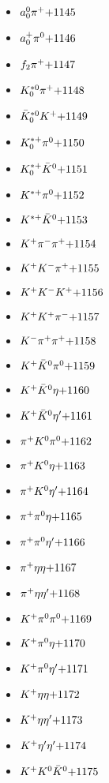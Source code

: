 \begin{multicols}{3}
\begin{itemize}
 \item $ a_{0}^{0} \pi^{+} \hfill{+1145}$
 \item $ a_{0}^{+} \pi^{0} \hfill{+1146}$
 \item $ f_{2} \pi^{+} \hfill{+1147}$
 \item $ K_{0}^{*0} \pi^{+} \hfill{+1148}$
 \item $ \bar{K}_{0}^{*0} K^{+} \hfill{+1149}$
 \item $ K_{0}^{*+} \pi^{0} \hfill{+1150}$
 \item $ K_{0}^{*+} \bar{K}^{0} \hfill{+1151}$
 \item $ K^{*+} \pi^{0} \hfill{+1152}$
 \item $ K^{*+} \bar{K}^{0} \hfill{+1153}$
 \item $ K^{+} \pi^{-} \pi^{+} \hfill{+1154}$
 \item $ K^{+} K^{-} \pi^{+} \hfill{+1155}$
 \item $ K^{+} K^{-} K^{+} \hfill{+1156}$
 \item $ K^{+} K^{+} \pi^{-} \hfill{+1157}$
 \item $ K^{-} \pi^{+} \pi^{+} \hfill{+1158}$
 \item $ K^{+} \bar{K}^{0} \pi^{0} \hfill{+1159}$
 \item $ K^{+} \bar{K}^{0} \eta \hfill{+1160}$
 \item $ K^{+} \bar{K}^{0} {\eta^{\prime}} \hfill{+1161}$
 \item $ \pi^{+} K^{0} \pi^{0} \hfill{+1162}$
 \item $ \pi^{+} K^{0} \eta \hfill{+1163}$
 \item $ \pi^{+} K^{0} {\eta^{\prime}} \hfill{+1164}$
 \item $ \pi^{+} \pi^{0} \eta \hfill{+1165}$
 \item $ \pi^{+} \pi^{0} {\eta^{\prime}} \hfill{+1166}$
 \item $ \pi^{+} \eta \eta \hfill{+1167}$
 \item $ \pi^{+} \eta {\eta^{\prime}} \hfill{+1168}$
 \item $ K^{+} \pi^{0} \pi^{0} \hfill{+1169}$
 \item $ K^{+} \pi^{0} \eta \hfill{+1170}$
 \item $ K^{+} \pi^{0} {\eta^{\prime}} \hfill{+1171}$
 \item $ K^{+} \eta \eta \hfill{+1172}$
 \item $ K^{+} \eta {\eta^{\prime}} \hfill{+1173}$
 \item $ K^{+} {\eta^{\prime}} {\eta^{\prime}} \hfill{+1174}$
 \item $ K^{+} K^{0} \bar{K}^{0} \hfill{+1175}$

\end{itemize}
\end{multicols}
